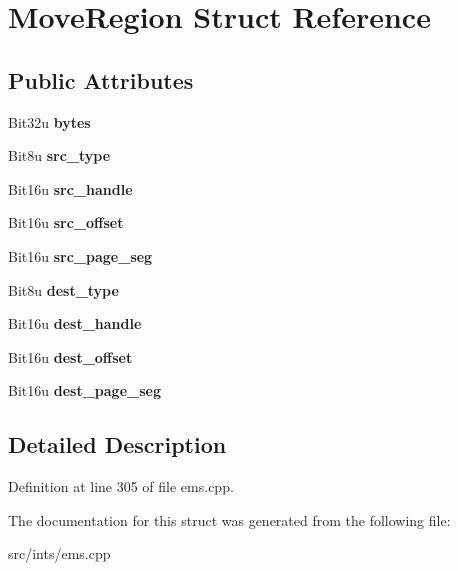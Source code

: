 \hypertarget{structMoveRegion}{\section{Move\-Region Struct Reference}
\label{structMoveRegion}
}
\subsection*{Public Attributes}
\begin{DoxyCompactItemize}
\item 
\hypertarget{structMoveRegion_ada38b05b3446e335d841d650849f9d5d}{Bit32u {\bfseries bytes}}\label{structMoveRegion_ada38b05b3446e335d841d650849f9d5d}

\item 
\hypertarget{structMoveRegion_a58be32d3a89f3d138f8e5f9b2f6ac045}{Bit8u {\bfseries src\-\_\-type}}\label{structMoveRegion_a58be32d3a89f3d138f8e5f9b2f6ac045}

\item 
\hypertarget{structMoveRegion_a63311208059116f9fe35ab840928bdf1}{Bit16u {\bfseries src\-\_\-handle}}\label{structMoveRegion_a63311208059116f9fe35ab840928bdf1}

\item 
\hypertarget{structMoveRegion_a342eb6b4ff673d978a2b532458fa74a6}{Bit16u {\bfseries src\-\_\-offset}}\label{structMoveRegion_a342eb6b4ff673d978a2b532458fa74a6}

\item 
\hypertarget{structMoveRegion_a69313d022b4712a2e78f6e34458ed10c}{Bit16u {\bfseries src\-\_\-page\-\_\-seg}}\label{structMoveRegion_a69313d022b4712a2e78f6e34458ed10c}

\item 
\hypertarget{structMoveRegion_a4475c59b94e5a93417ef80e4af630926}{Bit8u {\bfseries dest\-\_\-type}}\label{structMoveRegion_a4475c59b94e5a93417ef80e4af630926}

\item 
\hypertarget{structMoveRegion_a0f2a0c0e9a72bf10b5098fcd5f6a6379}{Bit16u {\bfseries dest\-\_\-handle}}\label{structMoveRegion_a0f2a0c0e9a72bf10b5098fcd5f6a6379}

\item 
\hypertarget{structMoveRegion_a992589a76ab78cf0708ab6adcda44348}{Bit16u {\bfseries dest\-\_\-offset}}\label{structMoveRegion_a992589a76ab78cf0708ab6adcda44348}

\item 
\hypertarget{structMoveRegion_aadb6e580104ef5f4668505b860d01f3f}{Bit16u {\bfseries dest\-\_\-page\-\_\-seg}}\label{structMoveRegion_aadb6e580104ef5f4668505b860d01f3f}

\end{DoxyCompactItemize}


\subsection{Detailed Description}


Definition at line 305 of file ems.\-cpp.



The documentation for this struct was generated from the following file\-:\begin{DoxyCompactItemize}
\item 
src/ints/ems.\-cpp\end{DoxyCompactItemize}
